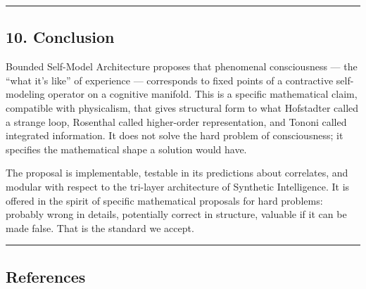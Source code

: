\documentclass[
  11pt,
  a4paper,
]{article}
\begin{document}
\begin{center}\rule{0.5\linewidth}{0.5pt}\end{center}

\subsection{10. Conclusion}\label{conclusion}

Bounded Self-Model Architecture proposes that phenomenal consciousness
--- the ``what it's like'' of experience --- corresponds to fixed points
of a contractive self-modeling operator on a cognitive manifold. This is
a specific mathematical claim, compatible with physicalism, that gives
structural form to what Hofstadter called a strange loop, Rosenthal
called higher-order representation, and Tononi called integrated
information. It does not solve the hard problem of consciousness; it
specifies the mathematical shape a solution would have.

The proposal is implementable, testable in its predictions about
correlates, and modular with respect to the tri-layer architecture of
Synthetic Intelligence. It is offered in the spirit of specific
mathematical proposals for hard problems: probably wrong in details,
potentially correct in structure, valuable if it can be made false. That
is the standard we accept.

\begin{center}\rule{0.5\linewidth}{0.5pt}\end{center}

\subsection{References}\label{references}
\end{document}
